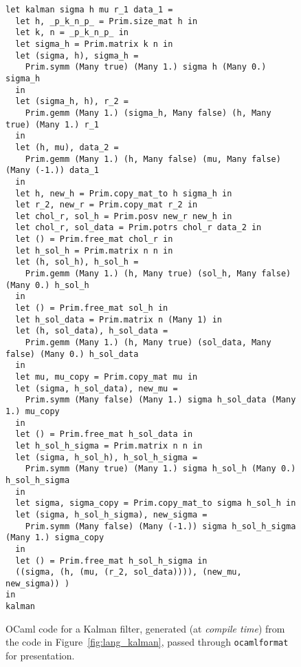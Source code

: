 \begin{figure}[p]
    \centering
    \begin{verbatim}
let kalman sigma h mu r_1 data_1 =
  let h, _p_k_n_p_ = Prim.size_mat h in
  let k, n = _p_k_n_p_ in
  let sigma_h = Prim.matrix k n in
  let (sigma, h), sigma_h =
    Prim.symm (Many true) (Many 1.) sigma h (Many 0.) sigma_h
  in
  let (sigma_h, h), r_2 =
    Prim.gemm (Many 1.) (sigma_h, Many false) (h, Many true) (Many 1.) r_1
  in
  let (h, mu), data_2 =
    Prim.gemm (Many 1.) (h, Many false) (mu, Many false) (Many (-1.)) data_1
  in
  let h, new_h = Prim.copy_mat_to h sigma_h in
  let r_2, new_r = Prim.copy_mat r_2 in
  let chol_r, sol_h = Prim.posv new_r new_h in
  let chol_r, sol_data = Prim.potrs chol_r data_2 in
  let () = Prim.free_mat chol_r in
  let h_sol_h = Prim.matrix n n in
  let (h, sol_h), h_sol_h =
    Prim.gemm (Many 1.) (h, Many true) (sol_h, Many false) (Many 0.) h_sol_h
  in
  let () = Prim.free_mat sol_h in
  let h_sol_data = Prim.matrix n (Many 1) in
  let (h, sol_data), h_sol_data =
    Prim.gemm (Many 1.) (h, Many true) (sol_data, Many false) (Many 0.) h_sol_data
  in
  let mu, mu_copy = Prim.copy_mat mu in
  let (sigma, h_sol_data), new_mu =
    Prim.symm (Many false) (Many 1.) sigma h_sol_data (Many 1.) mu_copy
  in
  let () = Prim.free_mat h_sol_data in
  let h_sol_h_sigma = Prim.matrix n n in
  let (sigma, h_sol_h), h_sol_h_sigma =
    Prim.symm (Many true) (Many 1.) sigma h_sol_h (Many 0.) h_sol_h_sigma
  in
  let sigma, sigma_copy = Prim.copy_mat_to sigma h_sol_h in
  let (sigma, h_sol_h_sigma), new_sigma =
    Prim.symm (Many false) (Many (-1.)) sigma h_sol_h_sigma (Many 1.) sigma_copy
  in
  let () = Prim.free_mat h_sol_h_sigma in
  ((sigma, (h, (mu, (r_2, sol_data)))), (new_mu, new_sigma)) )
in
kalman
    \end{verbatim}
    \caption{OCaml code for a Kalman filter, generated (at \emph{compile time})
        from the code in Figure~\ref{fig:lang_kalman}, passed through
        \texttt{ocamlformat} for presentation.}\label{fig:ocaml_kalman}

\end{figure}

